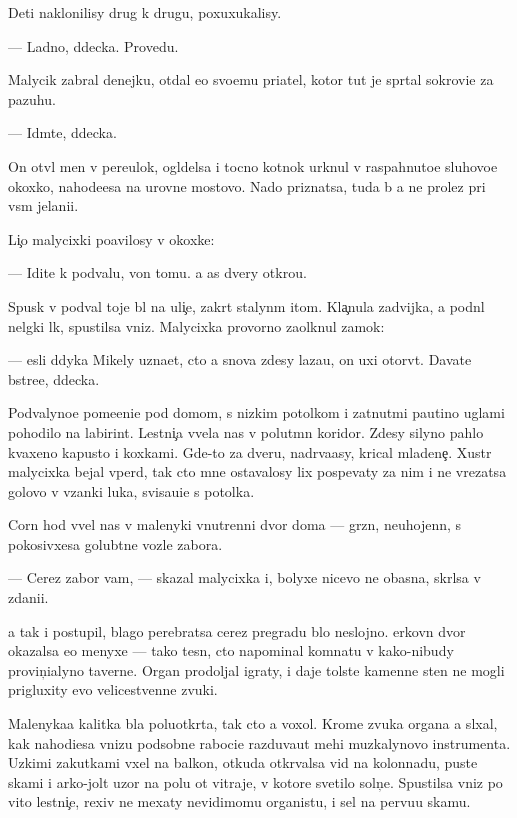 \documentclass[10pt]{book}
\begin{document}
Deti naklonilisy drug k drugu, poxuxukalisy.

— Ladno, d{\ia}decka. Provedu.

Malycik zabral denejku, otdal {\y}e{\y}o svo{\y}emu pri{\y}atel{\iu}, kotor{\yi}{\y} tut je spr{\ia}tal sokrovi{\x}e za pazuhu.

— Id{\e}mte, d{\ia}decka.

On otv{\e}l men{\ia} v pereulok, ogl{\ia}delsa i tocno kot{\e}nok {\y}urknul v raspahnuto{\y}e sluhovo{\y}e okoxko, nahod{\ia}{\x}e{\y}esa na urovne mostovo{\y}. Nado priznatsa, tuda b{\yi} {\y}a ne prolez pri vs{\e}m jelani{\y}i.

Li{\c}o malycixki po{\y}avilosy v okoxke:

— Idite k podvalu, von tomu. {\Y}a {\x}as dvery otkro{\y}u.

Spusk v podval toje b{\yi}l na uli{\c}e, zakr{\yi}t{\yi}{\y} stalyn{\yi}m {\x}itom. Kla{\c}nula zadvijka, {\y}a podn{\ia}l nel{\e}gki{\y} l{\iu}k, spustilsa vniz. Malycixka provorno za{\x}olknul zamok:

— {\Y}esli d{\ia}dyka Mikely uzna{\y}et, cto {\y}a snova zdesy laza{\y}u, on uxi otorv{\e}t. Dava{\y}te b{\yi}stre{\y}e, d{\ia}decka.

Podvalyno{\y}e pome{\x}eni{\y}e pod domom, s nizkim potolkom i zat{\ia}nut{\yi}mi pautino{\y} uglami pohodilo na labirint. Lestni{\c}a v{\yi}vela nas v polut{\e}mn{\yi}{\y} koridor. Zdesy silyno pahlo kvaxeno{\y} kapusto{\y} i koxkami. Gde-to za dver{\y}u, nadr{\yi}va{\y}asy, krical mladene{\c}. Xustr{\yi}{\y} malycixka bejal vper{\e}d, tak cto mne ostavalosy lix pospevaty za nim i ne vrezatsa golovo{\y} v v{\ia}zanki luka, svisa{\y}u{\x}i{\y}e s potolka.

Corn{\yi}{\y} hod v{\yi}vel nas v malenyki{\y} vnutrenni{\y} dvor doma — gr{\ia}zn{\yi}{\y}, neuhojenn{\yi}{\y}, s pokosivxe{\y}sa golub{\ia}tne{\y} vozle zabora.

— Cerez zabor vam, — skazal malycixka i, bolyxe nicevo ne ob{\y}asn{\ia}{\y}a, skr{\yi}lsa v zdani{\y}i.

{\Y}a tak i postupil, blago perebratsa cerez pregradu b{\yi}lo neslojno. {\C}erkovn{\yi}{\y} dvor okazalsa {\y}e{\x}o menyxe — tako{\y} tesn{\yi}{\y}, cto napominal komnatu v kako{\y}-nibudy provin{\c}ialyno{\y} taverne. Organ prodoljal igraty, i daje tolst{\yi}{\y}e kamenn{\yi}{\y}e sten{\yi} ne mogli prigluxity {\y}evo velicestvenn{\yi}{\y}e zvuki.

Malenyka{\y}a kalitka b{\yi}la poluotkr{\yi}ta, tak cto {\y}a voxol. Krome zvuka organa {\y}a sl{\yi}xal, kak nahod{\ia}{\x}i{\y}esa vnizu podsobn{\yi}{\y}e raboci{\y}e razduva{\y}ut mehi muz{\yi}kalynovo instrumenta. Uzkimi zakutkami v{\yi}xel na balkon, otkuda otkr{\yi}valsa vid na kolonnadu, pust{\yi}{\y}e skam{\yf}i i {\y}arko-jolt{\yi}{\y} uzor na polu ot vitraje{\y}, v kotor{\yi}{\y}e svetilo soln{\c}e. Spustilsa vniz po vito{\y} lestni{\c}e, rexiv ne mexaty nevidimomu organistu, i sel na pervu{\y}u skam{\y}u.
\end{document}
